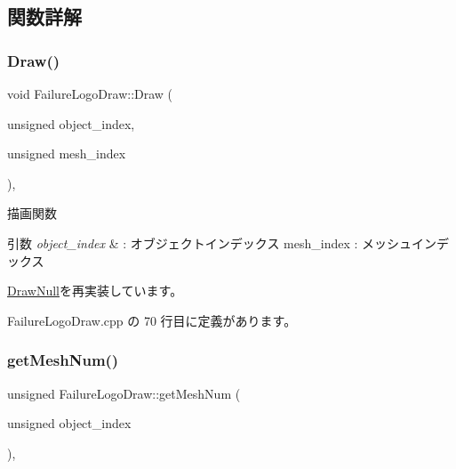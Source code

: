 \subsection{関数詳解}
\mbox{\label{class_failure_logo_draw_a8ee20e1697bbbaf7f41c18334830488a}} 
\subsubsection{\texorpdfstring{Draw()}{Draw()}}
{\footnotesize\ttfamily void Failure\+Logo\+Draw\+::\+Draw (\begin{DoxyParamCaption}\item[{unsigned}]{object\+\_\+index,  }\item[{unsigned}]{mesh\+\_\+index }\end{DoxyParamCaption})\hspace{0.3cm}{\ttfamily [override]}, {\ttfamily [virtual]}}



描画関数 


\begin{DoxyParams}{引数}
{\em object\+\_\+index} & \+: オブジェクトインデックス mesh\+\_\+index \+: メッシュインデックス \\
\hline
\end{DoxyParams}


\mbox{\hyperlink{class_draw_null_a72ac0b7dc40b1469582419dcc5b0e114}{Draw\+Null}}を再実装しています。



 Failure\+Logo\+Draw.\+cpp の 70 行目に定義があります。

\mbox{\label{class_failure_logo_draw_a45bb5d0965ca73b06ae0836f27f9b0e3}} 
\subsubsection{\texorpdfstring{get\+Mesh\+Num()}{getMeshNum()}}
{\footnotesize\ttfamily unsigned Failure\+Logo\+Draw\+::get\+Mesh\+Num (\begin{DoxyParamCaption}\item[{unsigned}]{object\+\_\+index }\end{DoxyParamCaption})\hspace{0.3cm}{\ttfamily [override]}, {\ttfamily [virtual]}}



